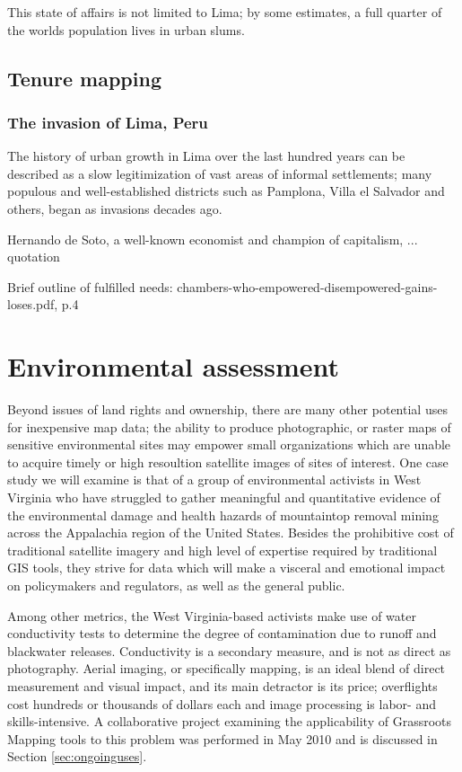 \documentclass[11pt]{report}
\begin{document}
This state of affairs is not limited to Lima; by some estimates, a full quarter of the worlds population lives in urban slums. 


\subsection{Tenure mapping}

\subsubsection{The invasion of Lima, Peru}

The history of urban growth in Lima over the last hundred years can be described as a slow legitimization of vast areas of informal settlements; many populous and well-established districts such as Pamplona, Villa el Salvador and others, began as invasions decades ago.

Hernando de Soto, a well-known economist and champion of capitalism, ... quotation

Brief outline of fulfilled needs: chambers-who-empowered-disempowered-gains-loses.pdf, p.4


\section{Environmental assessment}

Beyond issues of land rights and ownership, there are many other potential uses for inexpensive map data; the ability to produce photographic, or raster maps of sensitive environmental sites may empower small organizations which are unable to acquire timely or high resoultion satellite images of sites of interest. One case study we will examine is that of a group of environmental activists in West Virginia who have struggled to gather meaningful and quantitative evidence of the environmental damage and health hazards of mountaintop removal mining across the Appalachia region of the United States. Besides the prohibitive cost of traditional satellite imagery and high level of expertise required by traditional GIS tools, they strive for data which will make a visceral and emotional impact on policymakers and regulators, as well as the general public. 

Among other metrics, the West Virginia-based activists make use of water conductivity tests to determine the degree of contamination due to runoff and blackwater releases. Conductivity is a secondary measure, and is not as direct as photography. Aerial imaging, or specifically mapping, is an ideal blend of direct measurement and visual impact, and its main detractor is its price; overflights cost hundreds or thousands of dollars each and image processing is labor- and skills-intensive. A collaborative project examining the applicability of Grassroots Mapping tools to this problem was performed in May 2010 and is discussed in Section \ref{sec:ongoinguses}.
\end{document}
